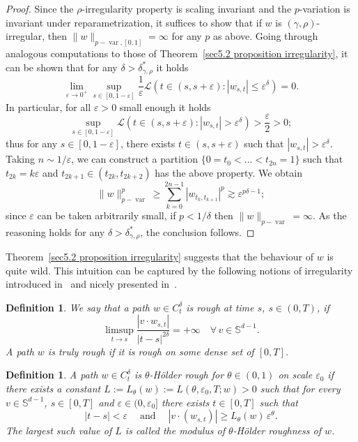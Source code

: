\documentclass[10pt]{article}
\newcommand{\assign}{:=}
\newcommand{\tmop}[1]{\ensuremath{\operatorname{#1}}}
\newtheorem{definition}[theorem]{Definition}
\begin{document}
\begin{proof}
  Since the $\rho$\mbox{-}irregularity property is scaling invariant and the
  $p$\mbox{-}variation is invariant under reparametrization, it suffices to
  show that if $w$ is $(\gamma, \rho)$\mbox{-}irregular, then $\| w \|_{p -
  \tmop{var}, [0, 1]} = \infty$ for any $p$ as above. Going through analogous
  computations to those of Theorem~\ref{sec5.2 proposition irregularity}, it
  can be shown that for any $\delta > \delta^{\ast}_{\gamma, \rho}$ it holds
  \[ \lim_{\varepsilon \rightarrow 0^+} \sup_{s \in [0, 1 - \varepsilon]}
     \frac{1}{\varepsilon} \mathcal{L} (t \in (s, s + \varepsilon) : | w_{s,
     t} | \leqslant \varepsilon^{\delta}) = 0. \]
  In particular, for all $\varepsilon > 0$ small enough it holds
  \[ \sup_{s \in [0, 1 - \varepsilon]} \mathcal{L} (t \in (s, s + \varepsilon)
     : | w_{s, t} | > \varepsilon^{\delta}) > \frac{\varepsilon}{2} > 0 ; \]
  thus for any $s \in [0, 1 - \varepsilon]$, there exists $t \in (s, s +
  \varepsilon)$ such that $| w_{s, t} | > \varepsilon^{\delta}$. Taking $n
  \sim 1 / \varepsilon$, we can construct a partition $\{ 0 = t_0 < \ldots <
  t_{2 n} = 1 \}$ such that $t_{2 k} = k \varepsilon$ and $t_{2 k + 1} \in
  (t_{2 k}, t_{2 k + 2})$ has the above property. We obtain
  \[ \| w \|_{p - \tmop{var}}^p \geqslant \sum_{k = 0}^{2 n - 1} | w_{t_k,
     t_{k + 1}} |^p \gtrsim \varepsilon^{p \delta - 1} ; \]
  since $\varepsilon$ can be taken arbitrarily small, if $p < 1 / \delta$ then
  $\| w \|_{p - \tmop{var}} = \infty$. As the reasoning holds for any $\delta
  > \delta^{\ast}_{\gamma, \rho}$, the conclusion follows.
\end{proof}

Theorem~\ref{sec5.2 proposition irregularity} suggests that the behaviour of
$w$ is quite wild. This intuition can be captured by the following notions of
irregularity introduced in~{\cite{frizdoobmeyer}} and nicely presented
in~{\cite{frizhairer}}.

\begin{definition}
  We say that a path $w \in C^{\delta}_t$ is rough at time $s$, $s \in (0,
  T)$, if
  \[ \limsup_{t \rightarrow s} \frac{| v \cdot w_{s, t} |}{| t - s |^{2
     \delta}} = + \infty \quad \forall \, v \in \mathbb{S}^{d - 1} . \]
  A path $w$ is truly rough if it is rough on some dense set of $[0, T]$.
\end{definition}

\begin{definition}
  A path $w \in C^{\delta}_t$ is $\theta$-H{\"o}lder rough for $\theta \in (0,
  1)$ on scale $\varepsilon_0$ if there exists a constant $L \assign
  L_{\theta} (w) \assign L (\theta, \varepsilon_0, T ; w) > 0$ such that for
  every $v \in \mathbb{S}^{d - 1}$, $s \in [0, T]$ and $\varepsilon \in (0,
  \varepsilon_0]$ there exists $t \in [0, T]$ such that
  \[ | t - s | < \varepsilon \quad \tmop{and} \quad | v \cdot (w_{s, t}) |
     \geqslant L_{\theta} (w) \, \varepsilon^{\theta} . \]
  The largest such value of $L$ is called the modulus of $\theta$-H{\"o}lder
  roughness of $w$. 
\end{definition}
\end{document}
